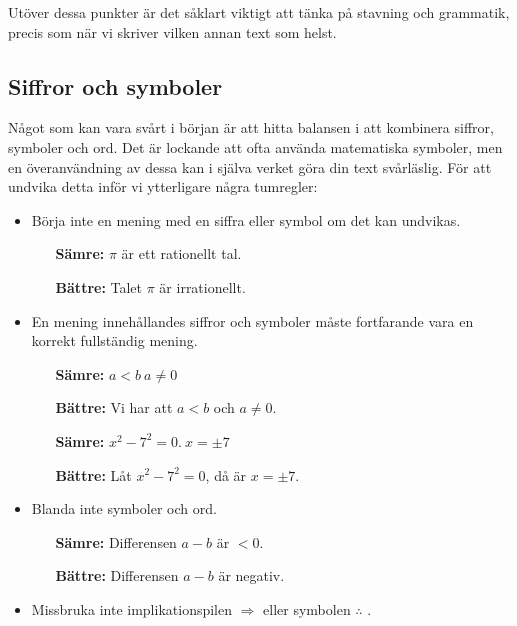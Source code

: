 \documentclass[titlepage]{article}
\begin{document}
Utöver dessa punkter är det såklart viktigt att tänka på stavning och grammatik, precis som när vi skriver vilken annan text som helst.




\subsection{Siffror och symboler}

Något som kan vara svårt i början är att hitta balansen i att kombinera siffror, symboler och ord. Det är lockande att ofta använda matematiska symboler, men en överanvändning av dessa kan i själva verket göra din text svårläslig. För att undvika detta inför vi ytterligare några tumregler:

\begin{itemize}
    \item Börja inte en mening med en siffra eller symbol om det kan undvikas.
        \begin{itemize}[leftmargin=20mm]
            \item[\textbf{Sämre:}] $\pi$ är ett rationellt tal.
            \item[\textbf{Bättre:}] Talet $\pi$ är irrationellt. 
        \end{itemize}
    \item En mening innehållandes siffror och symboler måste fortfarande vara en korrekt fullständig mening.
        \begin{itemize}[leftmargin=20mm]
            \item[\textbf{Sämre:}] $a < b \: a \neq 0$
            \item[\textbf{Bättre:}] Vi har att $a<b$ och $a \neq 0$.
            \vspace{2mm}
            \item[\textbf{Sämre:}] $x^2 - 7^2 = 0.\: x = \pm 7$
            \item[\textbf{Bättre:}] Låt $x^2 - 7^2 = 0$, då är $x = \pm 7.$
        \end{itemize}
    \item Blanda inte symboler och ord.
        \begin{itemize}[leftmargin=20mm]
            \item[\textbf{Sämre:}] Differensen $a-b$ är $<0$.
            \item[\textbf{Bättre:}] Differensen $a-b$ är negativ.
        \end{itemize}
    \item Missbruka inte implikationspilen $\Rightarrow$ eller symbolen $\therefore$ .

\end{itemize}
\end{document}
